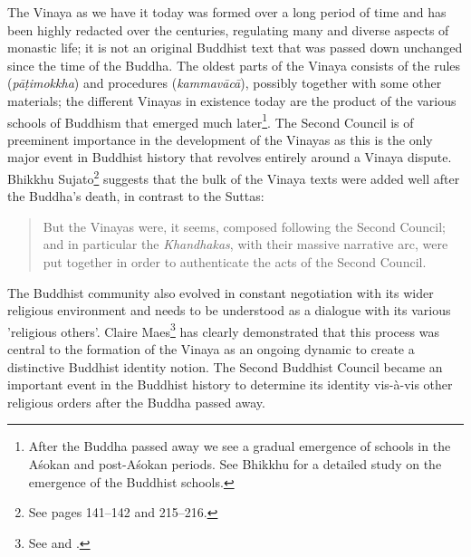 The Vinaya as we have it today was formed over a long period of time and has been highly redacted over the centuries, regulating many and diverse aspects of monastic life; it is not an original Buddhist text that was passed down unchanged since the time of the Buddha. The oldest parts of the Vinaya consists of the rules ({\em pāṭimokkha}) and procedures ({\em kammavācā}), possibly together with some other materials; the different Vinayas in existence today are the product of the various schools of Buddhism that emerged much later\footnote{After the Buddha passed away we see a gradual emergence of schools in the Aśokan and post-Aśokan periods. See Bhikkhu \cite{sujato2012} for a detailed study on the emergence of the Buddhist schools.}. The Second Council is of preeminent importance in the development of the Vinayas as this is the only major event in Buddhist history that revolves entirely around a Vinaya dispute. Bhikkhu Sujato\footnote{See \cite{sujato2009} pages 141–142 and 215–216.} suggests that the bulk of the Vinaya texts were added well after the Buddha's death, in contrast to the Suttas: 

\begin{quote}
But the Vinayas were, it seems, composed following the Second Council; and in particular the {\em Khandhakas}, with their massive narrative arc, were put together in order to authenticate the acts of the Second Council.
\end{quote}

The Buddhist community also evolved in constant negotiation with its wider religious environment and needs to be understood as a dialogue with its various 'religious others'. Claire Maes\footnote{See \cite{maes} and \cite{maes2016}.} has clearly demonstrated that this process was central to the formation of the Vinaya as an ongoing dynamic to create a distinctive Buddhist identity notion. The Second Buddhist Council became an important event in the Buddhist history to determine its identity vis-à-vis other religious orders after the Buddha passed away.


